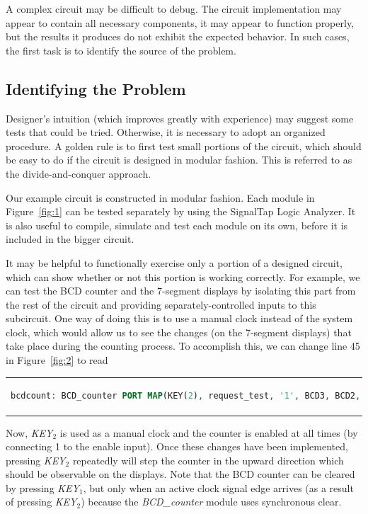 \documentclass[11pt, twoside, pdftex]{article}
\begin{document}
A complex circuit may be difficult to debug. The circuit implementation may appear 
to contain all necessary components, it may appear to function properly, but the 
results it produces do not exhibit the expected behavior. In such cases, the 
first task is to identify the source of the problem.

\subsection{Identifying the Problem}
Designer's intuition (which improves greatly with experience) may suggest some 
tests that could be tried. Otherwise, it is necessary to adopt an organized
procedure. A golden rule is to first test small portions of the circuit, which
should be easy to do if the circuit is designed in modular fashion. This is
referred to as the divide-and-conquer approach.

Our example circuit is constructed in modular fashion. Each module in Figure~\ref{fig:1}
can be tested separately by using the SignalTap Logic Analyzer. It is 
also useful to compile, simulate and test each module on its own, before it is 
included in the bigger circuit.

It may be helpful to functionally exercise only a portion of a designed circuit, 
which can show whether or not this portion is working correctly. For example,
we can test the BCD counter and the 7-segment displays by isolating this
part from the rest of the circuit and providing separately-controlled inputs
to this subcircuit. One way of doing this is to use a manual clock instead
of the system clock, which would allow us to see the changes (on the 7-segment
displays) that take place during the counting process. To accomplish this,
we can change line 45 in Figure~\ref{fig:2} to read
\begin{center}
\begin{tabular}{c}
\begin{lstlisting}[language=VHDL]
bcdcount: BCD_counter PORT MAP(KEY(2), request_test, '1', BCD3, BCD2, BCD1, BCD0);
\end{lstlisting}
\end{tabular} 
\end{center}
\noindent
Now, {\it KEY}$_2$ is used as a manual clock and the counter is enabled at
all times (by connecting 1 to the enable input). Once these changes have been implemented, pressing {\it KEY}$_2$
repeatedly will step the counter in the upward direction which should be 
observable on the displays. Note that the BCD counter can be cleared by
pressing {\it KEY}$_1$, but only when an active clock signal edge arrives
(as a result of pressing {\it KEY}$_2$) because the {\it BCD\_counter} module
uses synchronous clear.
\end{document}

